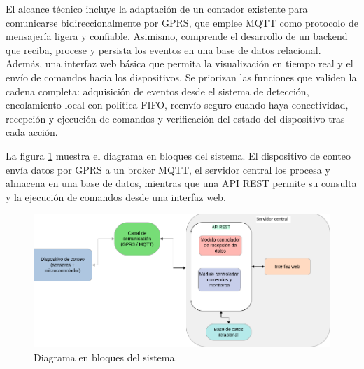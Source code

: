 El alcance técnico incluye la adaptación de un contador existente para comunicarse bidireccionalmente por GPRS, que emplee MQTT como protocolo de mensajería ligera y confiable. Asimismo, comprende el desarrollo de un backend que reciba, procese y persista los eventos en una base de datos relacional. Además, una interfaz web básica que permita la visualización en tiempo real y el envío de comandos hacia los dispositivos. Se priorizan las funciones que validen la cadena completa: adquisición de eventos desde el sistema de detección, encolamiento local con política FIFO, reenvío seguro cuando haya conectividad, recepción y ejecución de comandos y verificación del estado del dispositivo tras cada acción. 


La figura \ref{fig:diag_bloques} muestra el diagrama en bloques del sistema. 
El dispositivo de conteo envía datos por GPRS a un broker MQTT, el servidor central 
los procesa y almacena en una base de datos, mientras que una API REST permite su 
consulta y la ejecución de comandos desde una interfaz web.

\begin{figure}[H]
  \centering
  \includegraphics[width=\linewidth]{./Figures/diagBloques.png}
  \caption{Diagrama en bloques del sistema.}
  \label{fig:diag_bloques}
\end{figure}












